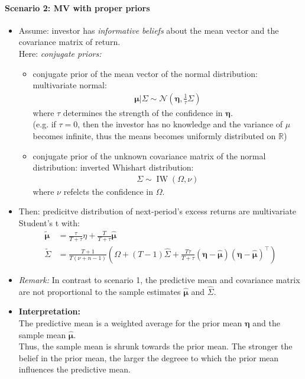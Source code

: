 \documentclass[a4paper,landscape,8pt,fleqn]{scrartcl}
\renewcommand{\emph}[1]{\textbf{#1}}
\DeclareMathOperator{\IW}{IW}					%
\begin{document}
\begin{multicols*}{3}
\paragraph{Scenario 2: MV with proper priors}
\begin{itemize}
\item Assume: investor has \textit{informative beliefs} about the mean vector and the covariance matrix of return. \\
Here: \textit{conjugate priors:}
\begin{itemize}
\item conjugate prior of the mean vector of the normal distribution: multivariate normal:
\begin{align*}
\bm \mu | \Sigma \sim \mathcal{N} \left( \bm \eta, \frac{1}{\tau} \Sigma \right)
\end{align*}
where $\tau$ determines the strength of the confidence in $\bm \eta$. \\
(e.g. if $\tau = 0$, then the investor has no knowledge and the variance of $\mu$ becomes infinite, thus the means becomes uniformly distributed on $\mathbb{R}$)
\item conjugate prior of the unknown covariance matrix of the normal distribution: inverted Whishart distribution:
\begin{align*}
\Sigma \sim \IW(\Omega, \nu)
\end{align*}
where $\nu$ refelcts the confidence in $\Omega$.
\end{itemize}
\item Then: predicitve distribution of next-period's excess returns are multivariate Student's t with:
\begin{align*}
\bm{\tilde \mu} &= \frac{\tau}{T+\tau} \eta + \frac{T}{T+\tau} \bm{\hat \mu} \\
\tilde \Sigma &= \frac{T+1}{T(\nu+n-1)} \left( \Omega + (T-1)\hat \Sigma + \frac{T \tau}{T+\tau} (\bm \eta - \bm{\hat \mu}) (\bm \eta - \bm{\hat \mu})^\top \right)
\end{align*}
\item \textit{Remark:} In contrast to scenario 1, the predictive mean and covariance matrix are not proportional to the sample estimates $\bm{\hat \mu}$ and $\hat \Sigma$.
\item \emph{Interpretation:} \\
The predictive mean is a weighted average for the prior mean $\bm \eta$ and the sample mean $\bm{\hat \mu}$. \\
Thus, the sample mean is shrunk towards the prior mean. The stronger the belief in the prior mean, the larger the degreee to which the prior mean influences the predictive mean.
\end{itemize}


\end{multicols*}
\end{document}
